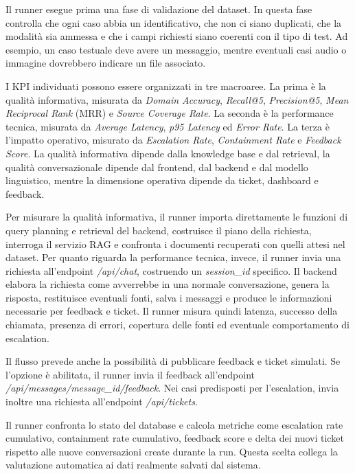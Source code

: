 Il runner esegue prima una fase di validazione del dataset. In questa fase controlla che ogni caso abbia un identificativo, che non ci siano duplicati, che la modalità sia ammessa e che i campi richiesti siano coerenti con il tipo di test. Ad esempio, un caso testuale deve avere un messaggio, mentre eventuali casi audio o immagine dovrebbero indicare un file associato.

I KPI individuati possono essere organizzati in tre macroaree. La prima è la qualità informativa, misurata da \textit{Domain Accuracy}, \textit{Recall@5}, \textit{Precision@5}, \textit{Mean Reciprocal Rank} (MRR) e \textit{Source Coverage Rate}. La seconda è la performance tecnica, misurata da \textit{Average Latency}, \textit{p95 Latency} ed \textit{Error Rate}. La terza è l’impatto operativo, misurato da \textit{Escalation Rate}, \textit{Containment Rate} e \textit{Feedback Score}. La qualità informativa dipende dalla knowledge base e dal retrieval, la qualità conversazionale dipende dal frontend, dal backend e dal modello linguistico, mentre la dimensione operativa dipende da ticket, dashboard e feedback.

Per misurare la qualità informativa, il runner importa direttamente le funzioni di query planning e retrieval del backend, costruisce il piano della richiesta, interroga il servizio RAG e confronta i documenti recuperati con quelli attesi nel dataset. Per quanto riguarda la performance tecnica, invece, il runner invia una richiesta all’endpoint \textit{/api/chat}, costruendo un \textit{session\_id} specifico. Il backend elabora la richiesta come avverrebbe in una normale conversazione, genera la risposta, restituisce eventuali fonti, salva i messaggi e produce le informazioni necessarie per feedback e ticket. Il runner misura quindi latenza, successo della chiamata, presenza di errori, copertura delle fonti ed eventuale comportamento di escalation.

Il flusso prevede anche la possibilità di pubblicare feedback e ticket simulati. Se l’opzione è abilitata, il runner invia il feedback all’endpoint \textit{/api/messages/message\_id/feedback}. Nei casi predisposti per l’escalation, invia inoltre una richiesta all’endpoint \textit{/api/tickets}.

Il runner confronta lo stato del database e calcola metriche come escalation rate cumulativo, containment rate cumulativo, feedback score e delta dei nuovi ticket rispetto alle nuove conversazioni create durante la run. Questa scelta collega la valutazione automatica ai dati realmente salvati dal sistema.


